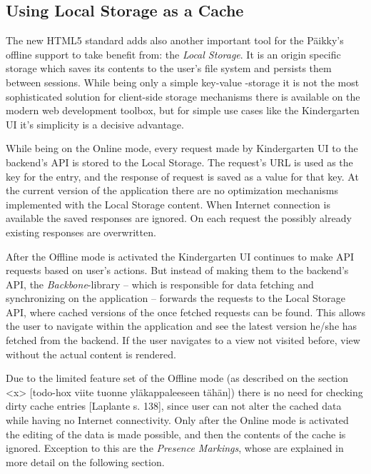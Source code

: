 



\subsection{Using Local Storage as a Cache}

The new HTML5 standard adds also another important tool for the Päikky's offline support to take benefit from: the \textit{Local Storage}. It is an origin specific storage which saves its contents to the user's file system and persists them between sessions. While being only a simple key-value -storage it is not the most sophisticated solution for client-side storage mechanisms there is available on the modern web development toolbox, but for simple use cases like the Kindergarten UI it's simplicity is a decisive advantage.

While being on the Online mode, every request made by Kindergarten UI to the backend's API is stored to the Local Storage. The request's URL is used as the key for the entry, and the response of request is saved as a value for that key. At the current version of the application there are no optimization mechanisms implemented with the Local Storage content. When Internet connection is available the saved responses are ignored. On each request the possibly already existing responses are overwritten.

After the Offline mode is activated the Kindergarten UI continues to make API requests based on user's actions. But instead of making them to the backend's API, the \textit{Backbone}-library – which is responsible for data fetching and synchronizing on the application – forwards the requests to the Local Storage API, where cached versions of the once fetched requests can be found. This allows the user to navigate within the application and see the latest version he/she has fetched from the backend. If the user navigates to a view not visited before, view without the actual content is rendered. 

Due to the limited feature set of the Offline mode (as described on the section <x> [todo-hox viite tuonne yläkappaleeseen tähän]) there is no need for checking dirty cache entries [Laplante s. 138], since user can not alter the cached data while having no Internet connectivity. Only after the Online mode is activated the editing of the data is made possible, and then the contents of the cache is ignored. Exception to this are the \textit{Presence Markings}, whose are explained in more detail on the following section.


